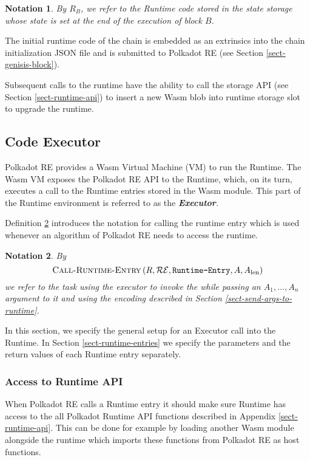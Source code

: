 \documentclass{book}
\newcommand{\tmem}[1]{{\em #1\/}}
\newcommand{\tmname}[1]{\textsc{#1}}
\newcommand{\tmop}[1]{\ensuremath{\operatorname{#1}}}
\newcommand{\tmstrong}[1]{\textbf{#1}}
\newcommand{\tmtextbf}[1]{{\bfseries{#1}}}
\newcommand{\tmtextit}[1]{{\itshape{#1}}}
\newcommand{\tmtextsc}[1]{{\scshape{#1}}}
\newcommand{\tmtexttt}[1]{{\ttfamily{#1}}}
\newcommand{\tmverbatim}[1]{{\ttfamily{#1}}}
\newtheorem{notation}{Notation}
\providecommand{\tmem}[1]{\tmtextit{#1}}
\providecommand{\tmname}[1]{\tmtextsc{#1}}
\providecommand{\tmop}[1]{\ensuremath{\mathrm{#1}}}
\providecommand{\tmstrong}[1]{\tmtextbf{#1}}
\providecommand{\tmtextbf}[1]{\tmtextbf{#1}}
\providecommand{\tmtextit}[1]{\tmtextit{#1}}
\providecommand{\tmverbatim}[1]{\tmtexttt{#1}}
\newtheorem{notation}{Notation}
\begin{document}
\begin{notation}
  \label{nota-runtime-code-at-state}By $R_B$, we refer to the Runtime code
  stored in the state storage whose state is set at the end of the execution
  of block $B$.
\end{notation}

The initial runtime code of the chain is embedded as an extrinsics into the
chain initialization JSON file and is submitted to Polkadot RE (see Section
\ref{sect-genisis-block}).

Subsequent calls to the runtime have the ability to call the storage API (see
Section \ref{sect-runtime-api}) to insert a new Wasm blob into runtime storage
slot to upgrade the runtime.

\subsection{Code Executor}

Polkadot RE provides a Wasm Virtual Machine (VM) to run the Runtime. The Wasm
VM exposes the Polkadot RE API to the Runtime, which, on its turn, executes a
call to the Runtime entries stored in the Wasm module. This part of the
Runtime environment is referred to as the {\tmem{{\tmstrong{Executor}}.}}

Definition \ref{nota-call-into-runtime} introduces the notation for calling
the runtime entry which is used whenever an algorithm of Polkadot RE needs to
access the runtime.

\begin{notation}
  \label{nota-call-into-runtime} By
  \[ \text{{\tmname{Call-Runtime-Entry}}} \left( R, \mathcal{R}\mathcal{E},
     \text{\tmverbatim{Runtime-Entry}}, A, A_{\tmop{len}} \right) \]
  we refer to the task using the executor to invoke the
  \tmverbatim{Runtime-Entry} while passing an $A_1, \ldots, A_n$ argument to
  it and using the encoding described in Section
  \ref{sect-send-args-to-runtime}.
\end{notation}

In this section, we specify the general setup for an Executor call into the
Runtime. In Section \ref{sect-runtime-entries} we specify the parameters and
the return values of each Runtime entry separately.

\subsubsection{Access to Runtime API}

When Polkadot RE calls a Runtime entry it should make sure Runtime has access
to the all Polkadot Runtime API functions described in Appendix
\ref{sect-runtime-api}. This can be done for example by loading another Wasm
module alongside the runtime which imports these functions from Polkadot RE as
host functions.
\end{document}
